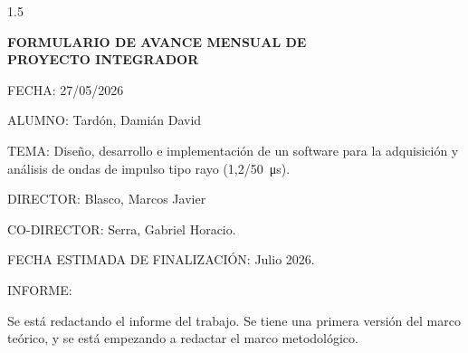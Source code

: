 \documentclass[11pt]{report} %
\begin{document}
    \begin{spacing}{1.5}
        \begin{flushleft}

                \begin{center}
                    \Large
                    \textbf{FORMULARIO DE AVANCE MENSUAL DE\\
                    PROYECTO INTEGRADOR}
                \end{center}
                \vspace{2em}

                FECHA: 27/05/2026

                ALUMNO: Tardón, Damián David

                TEMA: Diseño, desarrollo e implementación de un software para la adquisición y análisis de ondas de impulso tipo rayo (\SI[parse-numbers=false]{1,2/50}{\micro\second}).

                DIRECTOR: Blasco, Marcos Javier

                CO-DIRECTOR: Serra, Gabriel Horacio.

                FECHA ESTIMADA DE FINALIZACIÓN: Julio 2026.

                \hrulefill

                INFORME:

        \end{flushleft}
    \end{spacing}

    Se está redactando el informe del trabajo. Se tiene una primera versión del marco teórico, y se está empezando a redactar el marco metodológico.
\end{document}
